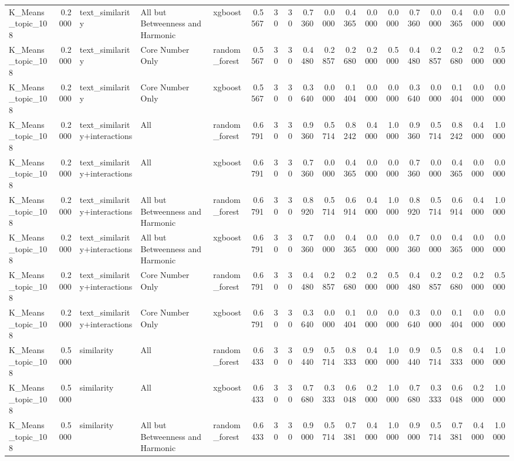 \begin{tabular}{lrlllrrrrrrrrrrrrr}
K_Means_topic_108 & 0.2000 & text_similarity & All but Betweenness and Harmonic & xgboost & 0.5567 & 30 & 30 & 0.7360 & 0.0000 & 0.4365 & 0.0000 & 0.0000 & 0.7360 & 0.0000 & 0.4365 & 0.0000 & 0.0000 \\
K_Means_topic_108 & 0.2000 & text_similarity & Core Number Only & random_forest & 0.5567 & 30 & 30 & 0.4480 & 0.2857 & 0.2680 & 0.2000 & 0.5000 & 0.4480 & 0.2857 & 0.2680 & 0.2000 & 0.5000 \\
K_Means_topic_108 & 0.2000 & text_similarity & Core Number Only & xgboost & 0.5567 & 30 & 30 & 0.3640 & 0.0000 & 0.1404 & 0.0000 & 0.0000 & 0.3640 & 0.0000 & 0.1404 & 0.0000 & 0.0000 \\
K_Means_topic_108 & 0.2000 & text_similarity+interactions & All & random_forest & 0.6791 & 30 & 30 & 0.9360 & 0.5714 & 0.8242 & 0.4000 & 1.0000 & 0.9360 & 0.5714 & 0.8242 & 0.4000 & 1.0000 \\
K_Means_topic_108 & 0.2000 & text_similarity+interactions & All & xgboost & 0.6791 & 30 & 30 & 0.7360 & 0.0000 & 0.4365 & 0.0000 & 0.0000 & 0.7360 & 0.0000 & 0.4365 & 0.0000 & 0.0000 \\
K_Means_topic_108 & 0.2000 & text_similarity+interactions & All but Betweenness and Harmonic & random_forest & 0.6791 & 30 & 30 & 0.8920 & 0.5714 & 0.6914 & 0.4000 & 1.0000 & 0.8920 & 0.5714 & 0.6914 & 0.4000 & 1.0000 \\
K_Means_topic_108 & 0.2000 & text_similarity+interactions & All but Betweenness and Harmonic & xgboost & 0.6791 & 30 & 30 & 0.7360 & 0.0000 & 0.4365 & 0.0000 & 0.0000 & 0.7360 & 0.0000 & 0.4365 & 0.0000 & 0.0000 \\
K_Means_topic_108 & 0.2000 & text_similarity+interactions & Core Number Only & random_forest & 0.6791 & 30 & 30 & 0.4480 & 0.2857 & 0.2680 & 0.2000 & 0.5000 & 0.4480 & 0.2857 & 0.2680 & 0.2000 & 0.5000 \\
K_Means_topic_108 & 0.2000 & text_similarity+interactions & Core Number Only & xgboost & 0.6791 & 30 & 30 & 0.3640 & 0.0000 & 0.1404 & 0.0000 & 0.0000 & 0.3640 & 0.0000 & 0.1404 & 0.0000 & 0.0000 \\
K_Means_topic_108 & 0.5000 & similarity & All & random_forest & 0.6433 & 30 & 30 & 0.9440 & 0.5714 & 0.8333 & 0.4000 & 1.0000 & 0.9440 & 0.5714 & 0.8333 & 0.4000 & 1.0000 \\
K_Means_topic_108 & 0.5000 & similarity & All & xgboost & 0.6433 & 30 & 30 & 0.7680 & 0.3333 & 0.6048 & 0.2000 & 1.0000 & 0.7680 & 0.3333 & 0.6048 & 0.2000 & 1.0000 \\
K_Means_topic_108 & 0.5000 & similarity & All but Betweenness and Harmonic & random_forest & 0.6433 & 30 & 30 & 0.9000 & 0.5714 & 0.7381 & 0.4000 & 1.0000 & 0.9000 & 0.5714 & 0.7381 & 0.4000 & 1.0000 \\

\end{tabular}
